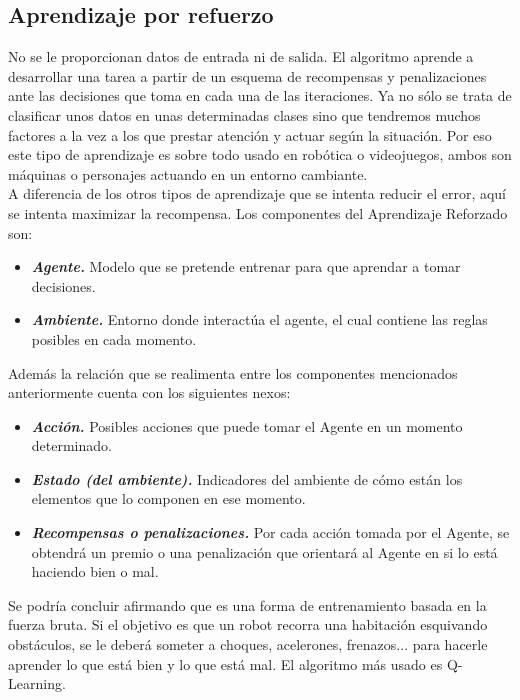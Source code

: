 \subsection{Aprendizaje por refuerzo}

No se le proporcionan datos de entrada ni de salida. El algoritmo aprende a desarrollar una tarea a partir de un esquema de recompensas y penalizaciones ante las decisiones que toma en cada una de las iteraciones. Ya no sólo se trata de clasificar unos datos en unas determinadas clases sino que tendremos muchos factores a la vez a los que prestar atención y actuar según la situación. Por eso este tipo de aprendizaje es sobre todo usado en robótica o videojuegos, ambos son máquinas o personajes actuando en un entorno cambiante.\\

A diferencia de los otros tipos de aprendizaje que se intenta reducir el error, aquí se intenta maximizar la recompensa. Los componentes del Aprendizaje Reforzado son:

\begin{itemize}
    \item \textit{\textbf{Agente.}} Modelo que se pretende entrenar para que aprendar a tomar decisiones.
    \item \textit{\textbf{Ambiente.}} Entorno donde interactúa el agente, el cual contiene las reglas posibles en cada momento.\\
\end{itemize}

Además la relación que se realimenta entre los componentes mencionados anteriormente cuenta con los siguientes nexos:

\begin{itemize}
    \item \textit{\textbf{Acción.}} Posibles acciones que puede tomar el Agente en un momento determinado.
    \item \textit{\textbf{Estado (del ambiente).}} Indicadores del ambiente de cómo están los elementos que lo componen en ese momento.
    \item \textit{\textbf{Recompensas o penalizaciones.}} Por cada acción tomada por el Agente, se obtendrá un premio o una penalización que orientará al Agente en si lo está haciendo bien o mal.
\end{itemize}

Se podría concluir afirmando que es una forma de entrenamiento basada en la fuerza bruta. Si el objetivo es que un robot recorra una habitación esquivando obstáculos, se le deberá someter a choques, acelerones, frenazos... para hacerle aprender lo que está bien y lo que está mal. El algoritmo más usado es Q-Learning.

